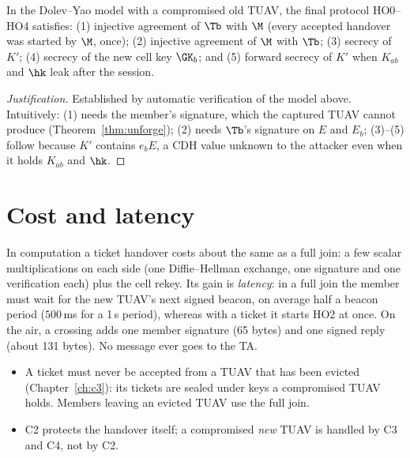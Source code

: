 \begin{theorem}\label{thm:ho}
In the Dolev--Yao model with a compromised old TUAV, the final protocol HO0--HO4 satisfies: (1) injective agreement of $\Tb$ with $\M$ (every accepted
handover was started by $\M$, once); (2) injective agreement of $\M$ with $\Tb$; (3) secrecy of $K'$; (4) secrecy of the new cell key $\GK_b$; and
(5) forward secrecy of $K'$ when $K_{ab}$ and $\hk$ leak after the session.
\end{theorem}
\begin{proof}[Justification]
Established by automatic verification of the model above. Intuitively: (1) needs the member's signature, which the captured TUAV cannot produce
(Theorem~\ref{thm:unforge}); (2) needs $\Tb$'s signature on $E$ and $E_b$; (3)--(5) follow because $K'$ contains $e_bE$, a CDH value unknown to the attacker
even when it holds $K_{ab}$ and $\hk$.
\end{proof}

\section{Cost and latency}
In computation a ticket handover costs about the same as a full join: a few scalar multiplications on each side (one Diffie--Hellman exchange, one
signature and one verification each) plus the cell rekey. Its gain is \emph{latency}: in a full join the member must wait for the new TUAV's next signed
beacon, on average half a beacon period ($500$\,ms for a 1\,s period), whereas with a ticket it starts HO2 at once. On the air, a crossing adds one
member signature (65 bytes) and one signed reply (about 131 bytes). No message ever goes to the TA.

\begin{limitbox}
\begin{itemize}[leftmargin=*]
\item A ticket must never be accepted from a TUAV that has been evicted (Chapter~\ref{ch:c3}): its tickets are sealed under keys a compromised TUAV holds.
Members leaving an evicted TUAV use the full join.
\item C2 protects the handover itself; a compromised \emph{new} TUAV is handled by C3 and C4, not by C2.
\end{itemize}
\end{limitbox}
